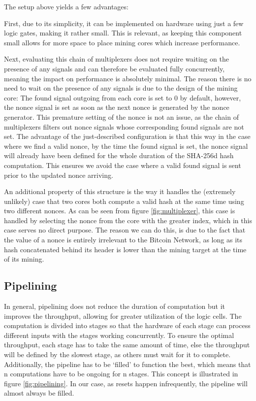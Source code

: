 The setup above yields a few advantages: 

First, due to its simplicity, it can be implemented on hardware using just a few logic gates, making it rather small. This is relevant, as keeping this component small allows for more space to place mining cores which increase performance.

Next, evaluating this chain of multiplexers does not require waiting on the presence of any signals and can therefore be evaluated fully concurrently, meaning the impact on performance is absolutely minimal. The reason there is no need to wait on the presence of any signals is due to the design of the mining core: The found signal outgoing from each core is set to 0 by default, however, the nonce signal is set as soon as the next nonce is generated by the nonce generator. This premature setting of the nonce is not an issue, as the chain of multiplexers filters out nonce signals whose corresponding found signals are not set. The advantage of the just-described configuration is that this way in the case where we find a valid nonce, by the time the found signal is set, the nonce signal will already have been defined for the whole duration of the SHA-256d hash computation. This ensures we avoid the case where a valid found signal is sent prior to the updated nonce arriving.

An additional property of this structure is the way it handles the (extremely unlikely) case that two cores both compute a valid hash at the same time using two different nonces. As can be seen from figure \ref{fig:multiplexer}, this case is handled by selecting the nonce from the core with the greater index, which in this case serves no direct purpose. The reason we can do this, is due to the fact that the value of a nonce is entirely irrelevant to the Bitcoin Network, as long as its hash concatenated behind its header is lower than the mining target at the time of its mining.

\subsection{Pipelining}

In general, pipelining does not reduce the duration of computation but it improves the throughput, allowing for greater utilization of the logic cells. The computation is divided into stages so that the hardware of each stage can process different inputs with the stages working concurrently. To ensure the optimal throughput, each stage has to take the same amount of time, else the throughput will be defined by the slowest stage, as others must wait for it to complete. Additionally, the pipeline has to be ‘filled’ to function the best, which means that n computations have to be ongoing for n stages. This concept is illustrated in figure \ref{fig:pipelining}. In our case, as resets happen infrequently, the pipeline will almost always be filled.

